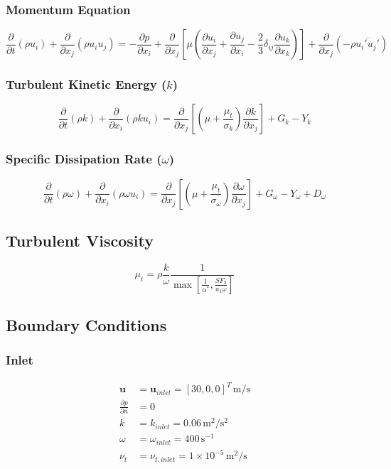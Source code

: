\documentclass{article}
\begin{document}
\subsubsection{Momentum Equation}
\begin{equation}
\frac{\partial}{\partial t}(\rho u_i) + \frac{\partial}{\partial x_j}(\rho u_i u_j) = -\frac{\partial p}{\partial x_i} + \frac{\partial}{\partial x_j}\left[\mu \left(\frac{\partial u_i}{\partial x_j} + \frac{\partial u_j}{\partial x_i} - \frac{2}{3}\delta_{ij}\frac{\partial u_k}{\partial x_k}\right)\right] + \frac{\partial}{\partial x_j}(-\rho \overline{u_i' u_j'})
\end{equation}

\subsubsection{Turbulent Kinetic Energy ($k$)}
\begin{equation}
\frac{\partial}{\partial t}(\rho k) + \frac{\partial}{\partial x_i}(\rho k u_i) = \frac{\partial}{\partial x_j}\left[\left(\mu + \frac{\mu_t}{\sigma_k}\right) \frac{\partial k}{\partial x_j}\right] + G_k - Y_k
\end{equation}

\subsubsection{Specific Dissipation Rate ($\omega$)}
\begin{equation}
\frac{\partial}{\partial t}(\rho \omega) + \frac{\partial}{\partial x_i}(\rho \omega u_i) = \frac{\partial}{\partial x_j}\left[\left(\mu + \frac{\mu_t}{\sigma_\omega}\right) \frac{\partial \omega}{\partial x_j}\right] + G_\omega - Y_\omega + D_\omega
\end{equation}

\subsection{Turbulent Viscosity}
\begin{equation}
\mu_t = \rho \frac{k}{\omega} \frac{1}{\max\left[\frac{1}{\alpha^*}, \frac{SF_2}{a_1\omega}\right]}
\end{equation}

\subsection{Boundary Conditions}
\subsubsection{Inlet}
\begin{align}
\mathbf{u} &= \mathbf{u}_{inlet} = [30, 0, 0]^T \, \text{m/s} \\
\frac{\partial p}{\partial n} &= 0 \\
k &= k_{inlet} = 0.06 \, \text{m}^2/\text{s}^2 \\
\omega &= \omega_{inlet} = 400 \, \text{s}^{-1} \\
\nu_t &= \nu_{t,inlet} = 1 \times 10^{-5} \, \text{m}^2/\text{s}
\end{align}
\end{document}
